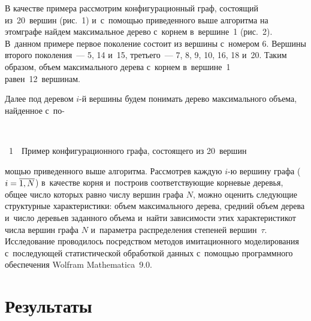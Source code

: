 \begin{multicols}{2}
\vspace{-9pt}


В качестве примера рассмотрим конфигурационный граф, состоящий из~20~вершин 
(рис.~1) и~с~по\-мощью приведенного выше алгоритма на этом\linebreak \mbox{графе} найдем 
максимальное дерево с~корнем в~вершине~1 (рис.~2).
В~данном примере первое поколение состоит из вершины с~номером 6.
Вершины второго поколения~--- 5, 14 и~15, третьего~--- 7, 8, 9, 10, 16, 18
 и~20. 
Таким образом, объем максимального дерева с~корнем в~вершине~1 ра\-вен~12~вершинам.

Далее под деревом $i$-й вершины будем понимать дерево максимального объема, 
найденное с~по-\linebreak\vspace*{-12pt}


{ \begin{center}  %
 \vspace*{-6.5pt}
     \mbox{%
\epsfxsize=75mm %
}

\end{center}

\vspace*{-7pt}

\noindent
{{\figurename~1}\ \ \small{Пример конфигурационного графа, состоящего из 20~вершин
}}}


\addtocounter{figure}{1}

\noindent
мощью приведенного выше алгоритма.
Рас\-смот\-рев каждую $i$-ю вершину графа ($i\hm=\overline{1,N}$) в~качестве корня и~построив 
соответствующие корневые деревья, общее число которых равно числу вершин графа 
$N$, можно оценить следующие структурные характеристики: объем максимального 
дерева, средний объем дерева и~число деревьев заданного объема и~найти 
зависимости этих характеристик\linebreak от числа вершин графа $N$ и~параметра 
распределения степеней вершин~$\tau$.
Исследование проводилось посредством методов имитационного моделирования с~последующей статистической 
\mbox{обработкой} данных с~пом\-ощью 
программного обеспечения Wolfram  Mathematica~9.0.

\vspace*{-6pt}

\section{Результаты}


\end{multicols}
